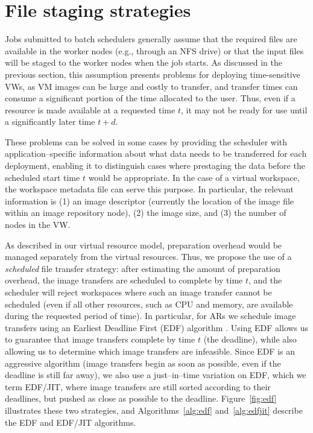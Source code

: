 \section{File staging strategies}
\label{sec:filestaging}

Jobs submitted to batch schedulers generally assume that the required files are available in the worker nodes (e.g., through an NFS drive) or that the input files will be staged to the worker nodes when the job starts. As discussed in the previous section, this assumption presents problems for deploying time{}-sensitive VWs, as VM images can be large and costly to transfer, and transfer times can consume a significant portion of the time allocated to the user. Thus, even if a resource is made available at a requested time $t$, it may not be ready for use until a significantly later time $t+d$.

These problems can be solved in some cases by providing the scheduler with application--specific information about what data needs to be transferred for each deployment, enabling it to distinguish cases where prestaging the data before the scheduled start time $t$ would be appropriate. In the case of a virtual workspace, the workspace metadata file can serve this purpose. In particular, the relevant information is (1) an image descriptor (currently the location of the image file within an image repository node), (2) the image size, and (3) the number of nodes in the VW.

As described in our virtual resource model, preparation overhead would be managed separately from the virtual resources. Thus, we propose the use of a \emph{scheduled} file transfer strategy: after estimating the amount of preparation overhead, the image transfers are scheduled to complete by time $t$, and the scheduler will reject workspaces where such an image transfer cannot be scheduled (even if all other resources, such as CPU and memory, are available during the requested period of time). In particular, for ARs we schedule image transfers using an Earliest Deadline First (EDF) algorithm \cite{BorjaCite22}. Using EDF allows us to guarantee that image transfers complete by time $t$ (the deadline), while also allowing us to determine which image transfers are infeasible. Since EDF is an aggressive algorithm (image transfers begin as soon as possible, even if the deadline is still far away), we also use a just--in--time variation on EDF, which we term EDF/JIT, where image transfers are still sorted according to their deadlines, but pushed as close as possible to the deadline. Figure~\ref{fig:edf} illustrates these two strategies, and Algorithms~\ref{alg:edf} and~\ref{alg:edfjit} describe the EDF and EDF/JIT algorithms.

